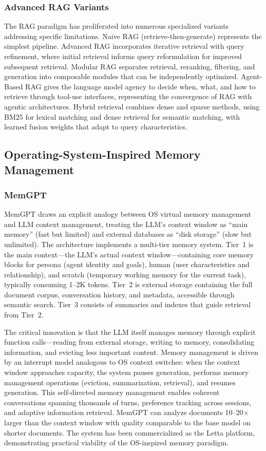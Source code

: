 \documentclass[11pt,letterpaper]{article}
\begin{document}
\subsubsection{Advanced RAG Variants}

The RAG paradigm has proliferated into numerous specialized variants addressing specific limitations. Naive RAG (retrieve-then-generate) represents the simplest pipeline. Advanced RAG incorporates iterative retrieval with query refinement, where initial retrieval informs query reformulation for improved subsequent retrieval. Modular RAG separates retrieval, reranking, filtering, and generation into composable modules that can be independently optimized. Agent-Based RAG gives the language model agency to decide when, what, and how to retrieve through tool-use interfaces, representing the convergence of RAG with agentic architectures. Hybrid retrieval combines dense and sparse methods, using BM25 for lexical matching and dense retrieval for semantic matching, with learned fusion weights that adapt to query characteristics.

\subsection{Operating-System-Inspired Memory Management}

\subsubsection{MemGPT}

MemGPT \cite{packer2023memgpt} draws an explicit analogy between OS virtual memory management and LLM context management, treating the LLM's context window as ``main memory'' (fast but limited) and external databases as ``disk storage'' (slow but unlimited). The architecture implements a multi-tier memory system. Tier~1 is the main context---the LLM's actual context window---containing core memory blocks for persona (agent identity and goals), human (user characteristics and relationship), and scratch (temporary working memory for the current task), typically consuming 1--2K tokens. Tier~2 is external storage containing the full document corpus, conversation history, and metadata, accessible through semantic search. Tier~3 consists of summaries and indexes that guide retrieval from Tier~2.

The critical innovation is that the LLM itself manages memory through explicit function calls---reading from external storage, writing to memory, consolidating information, and evicting less important content. Memory management is driven by an interrupt model analogous to OS context switches: when the context window approaches capacity, the system pauses generation, performs memory management operations (eviction, summarization, retrieval), and resumes generation. This self-directed memory management enables coherent conversations spanning thousands of turns, preference tracking across sessions, and adaptive information retrieval. MemGPT can analyze documents 10--20$\times$ larger than the context window with quality comparable to the base model on shorter documents. The system has been commercialized as the Letta platform, demonstrating practical viability of the OS-inspired memory paradigm.
\end{document}
